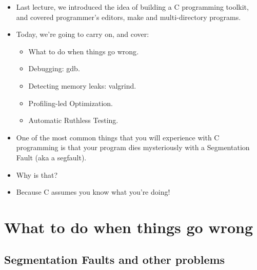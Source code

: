 \documentclass[aspectratio=169]{beamer}
\newcommand{\pitem}{\pause \item}
\begin{document}
\begin{frame}[fragile]
  \begin{itemize}
    \item
      Last lecture, we introduced the idea of building a
      \alert{C programming toolkit},
      and covered programmer's editors, make and multi-directory programs.

    \pitem
      Today, we're going to carry on, and cover:
      \begin{itemize}
      \item
        \alert{What to do when things go wrong}.
      \item
        \alert{Debugging: gdb}.
      \pitem
        \alert{Detecting memory leaks: valgrind}.
      \pitem
        \alert{Profiling-led Optimization}.
      \pitem
        \alert{Automatic Ruthless Testing}.
    \end{itemize}


    \pitem
    One of the most common things that you will experience with C programming
    is that your program dies mysteriously with a \alert{Segmentation Fault} (aka a \alert{segfault}).
    
    \item
    Why is that?

    \pitem
    \alert{Because C assumes you know what you're doing}!

  \end{itemize}
\end{frame}

\section{What to do when things go wrong}
\subsection{Segmentation Faults and other problems}
\end{document}
